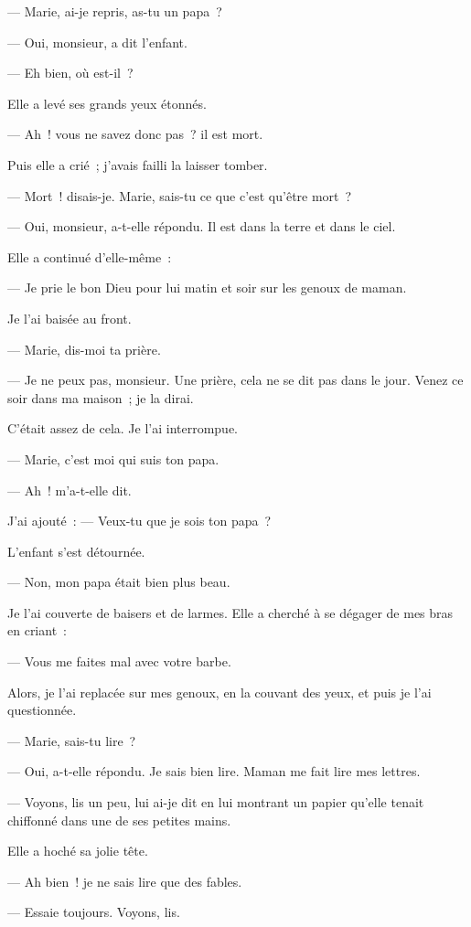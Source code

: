\documentclass[french,twoside]{book} %
\begin{document}
— Marie, ai-je repris, as-tu un papa ?\par
— Oui, monsieur, a dit l’enfant.\par
— Eh bien, où est-il ?\par
Elle a levé ses grands yeux étonnés.\par
— Ah ! vous ne savez donc pas ? il est mort.\par
Puis elle a crié ; j’avais failli la laisser tomber.\par
 — Mort ! disais-je. Marie, sais-tu ce que c’est qu’être mort ?\par
— Oui, monsieur, a-t-elle répondu. Il est dans la terre et dans le ciel.\par
Elle a continué d’elle-même :\par
— Je prie le bon Dieu pour lui matin et soir sur les genoux de maman.\par
Je l’ai baisée au front.\par
— Marie, dis-moi ta prière.\par
— Je ne peux pas, monsieur. Une prière, cela ne se dit pas dans le jour. Venez ce soir dans ma maison ; je la dirai.\par
C’était assez de cela. Je l’ai interrompue.\par
— Marie, c’est moi qui suis ton papa.\par
— Ah ! m’a-t-elle dit.\par
J’ai ajouté : — Veux-tu que je sois ton papa ?\par
L’enfant s’est détournée.\par
— Non, mon papa était bien plus beau.\par
Je l’ai couverte de baisers et de larmes. Elle a cherché à se dégager de mes bras en criant :\par
— Vous me faites mal avec votre barbe.\par
Alors, je l’ai replacée sur mes genoux, en la couvant des yeux, et puis je l’ai questionnée.\par
— Marie, sais-tu lire ?\par
— Oui, a-t-elle répondu. Je sais bien lire. Maman me fait lire mes lettres.\par
— Voyons, lis un peu, lui ai-je dit en lui montrant un papier qu’elle tenait chiffonné dans une de ses petites mains.\par
Elle a hoché sa jolie tête.\par
 — Ah bien ! je ne sais lire que des fables.\par
— Essaie toujours. Voyons, lis.\par
\end{document}

